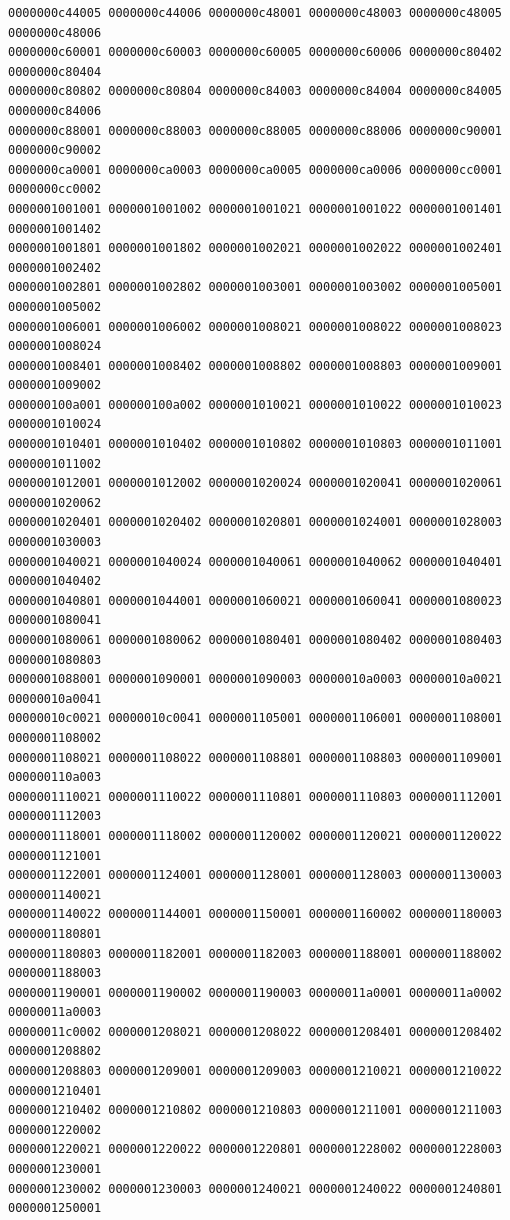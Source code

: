 \begin{Verbatim}[fontsize=\scriptsize]
0000000c44005 0000000c44006 0000000c48001 0000000c48003 0000000c48005 0000000c48006
0000000c60001 0000000c60003 0000000c60005 0000000c60006 0000000c80402 0000000c80404
0000000c80802 0000000c80804 0000000c84003 0000000c84004 0000000c84005 0000000c84006
0000000c88001 0000000c88003 0000000c88005 0000000c88006 0000000c90001 0000000c90002
0000000ca0001 0000000ca0003 0000000ca0005 0000000ca0006 0000000cc0001 0000000cc0002
0000001001001 0000001001002 0000001001021 0000001001022 0000001001401 0000001001402
0000001001801 0000001001802 0000001002021 0000001002022 0000001002401 0000001002402
0000001002801 0000001002802 0000001003001 0000001003002 0000001005001 0000001005002
0000001006001 0000001006002 0000001008021 0000001008022 0000001008023 0000001008024
0000001008401 0000001008402 0000001008802 0000001008803 0000001009001 0000001009002
000000100a001 000000100a002 0000001010021 0000001010022 0000001010023 0000001010024
0000001010401 0000001010402 0000001010802 0000001010803 0000001011001 0000001011002
0000001012001 0000001012002 0000001020024 0000001020041 0000001020061 0000001020062
0000001020401 0000001020402 0000001020801 0000001024001 0000001028003 0000001030003
0000001040021 0000001040024 0000001040061 0000001040062 0000001040401 0000001040402
0000001040801 0000001044001 0000001060021 0000001060041 0000001080023 0000001080041
0000001080061 0000001080062 0000001080401 0000001080402 0000001080403 0000001080803
0000001088001 0000001090001 0000001090003 00000010a0003 00000010a0021 00000010a0041
00000010c0021 00000010c0041 0000001105001 0000001106001 0000001108001 0000001108002
0000001108021 0000001108022 0000001108801 0000001108803 0000001109001 000000110a003
0000001110021 0000001110022 0000001110801 0000001110803 0000001112001 0000001112003
0000001118001 0000001118002 0000001120002 0000001120021 0000001120022 0000001121001
0000001122001 0000001124001 0000001128001 0000001128003 0000001130003 0000001140021
0000001140022 0000001144001 0000001150001 0000001160002 0000001180003 0000001180801
0000001180803 0000001182001 0000001182003 0000001188001 0000001188002 0000001188003
0000001190001 0000001190002 0000001190003 00000011a0001 00000011a0002 00000011a0003
00000011c0002 0000001208021 0000001208022 0000001208401 0000001208402 0000001208802
0000001208803 0000001209001 0000001209003 0000001210021 0000001210022 0000001210401
0000001210402 0000001210802 0000001210803 0000001211001 0000001211003 0000001220002
0000001220021 0000001220022 0000001220801 0000001228002 0000001228003 0000001230001
0000001230002 0000001230003 0000001240021 0000001240022 0000001240801 0000001250001

\end{Verbatim}
